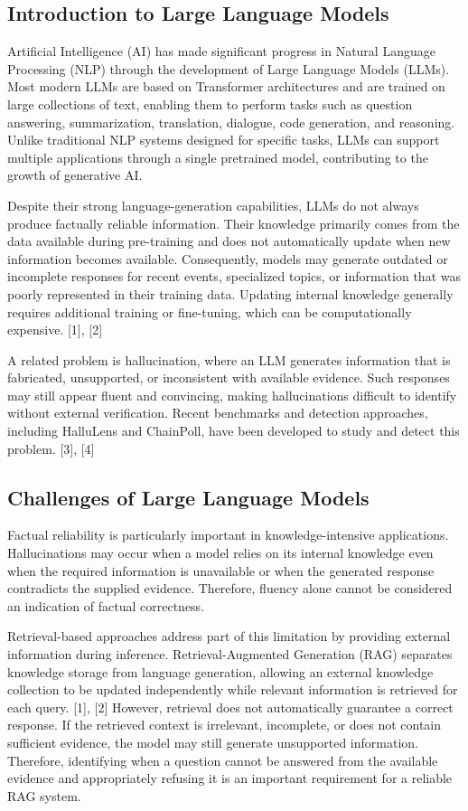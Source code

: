 \documentclass[conference]{IEEEtran}
\begin{document}
\subsection{Introduction to Large Language Models}
Artificial Intelligence (AI) has made significant progress in Natural Language Processing (NLP) through the development of Large Language Models (LLMs). Most modern LLMs are based on Transformer architectures and are trained on large collections of text, enabling them to perform tasks such as question answering, summarization, translation, dialogue, code generation, and reasoning. Unlike traditional NLP systems designed for specific tasks, LLMs can support multiple applications through a single pretrained model, contributing to the growth of generative AI.

Despite their strong language-generation capabilities, LLMs do not always produce factually reliable information. Their knowledge primarily comes from the data available during pre-training and does not automatically update when new information becomes available. Consequently, models may generate outdated or incomplete responses for recent events, specialized topics, or information that was poorly represented in their training data. Updating internal knowledge generally requires additional training or fine-tuning, which can be computationally expensive. [1], [2]

A related problem is hallucination, where an LLM generates information that is fabricated, unsupported, or inconsistent with available evidence. Such responses may still appear fluent and convincing, making hallucinations difficult to identify without external verification. Recent benchmarks and detection approaches, including HalluLens and ChainPoll, have been developed to study and detect this problem. [3], [4]

\subsection{Challenges of Large Language Models}
Factual reliability is particularly important in knowledge-intensive applications. Hallucinations may occur when a model relies on its internal knowledge even when the required information is unavailable or when the generated response contradicts the supplied evidence. Therefore, fluency alone cannot be considered an indication of factual correctness.

Retrieval-based approaches address part of this limitation by providing external information during inference. Retrieval-Augmented Generation (RAG) separates knowledge storage from language generation, allowing an external knowledge collection to be updated independently while relevant information is retrieved for each query. [1], [2] However, retrieval does not automatically guarantee a correct response. If the retrieved context is irrelevant, incomplete, or does not contain sufficient evidence, the model may still generate unsupported information. Therefore, identifying when a question cannot be answered from the available evidence and appropriately refusing it is an important requirement for a reliable RAG system.
\end{document}
